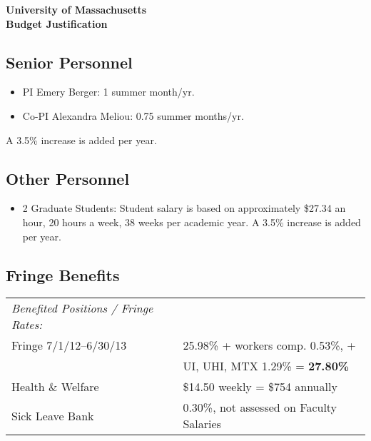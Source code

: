\thispagestyle{empty}
\singlespace

\begin{center}
        {\large\bf\textsf{
            University of Massachusetts \\ Budget Justification}}
\end{center}

\subsection*{Senior Personnel}
\begin{itemize}
\item PI Emery Berger:  1 summer month/yr.
\item Co-PI Alexandra Meliou: 0.75 summer months/yr.
\end{itemize}

A 3.5\% increase is added per year.

\subsection*{Other Personnel}
\begin{itemize}
\item 2 Graduate Students: Student salary is based on approximately \$27.34 an hour, 
 20 hours a week, 38 weeks per academic year.
 A 3.5\% increase is added per year. 
\end{itemize}

\subsection*{Fringe Benefits}

\begin{table}[!h]
\centering
\begin{tabular}{|l|l|}
\hline
\emph{Benefited Positions / Fringe Rates:} &  \\
Fringe 7/1/12--6/30/13 &   25.98\% + workers comp. 0.53\%, +      \\
                       &   UI, UHI, MTX 1.29\% = \textbf{27.80\%} \\
\hline
Health \& Welfare      &   \$14.50 weekly = \$754 annually        \\
\hline
Sick Leave Bank        & 0.30\%, not assessed on Faculty Salaries \\
\hline
\end{tabular}
\end{table}

